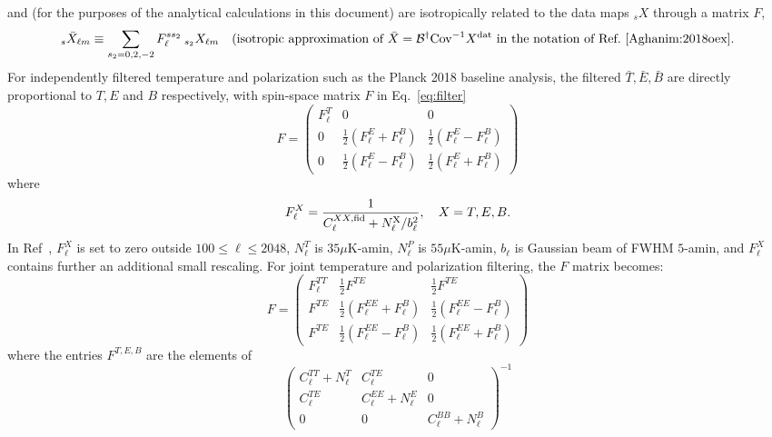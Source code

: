 \documentclass{article}
\newcommand{\Cov}[0]{{\textrm{Cov}}}
\begin{document}
and (for the purposes of the analytical calculations in this document) are isotropically related to the data maps $_sX$ through a matrix $F$,
\begin{equation}\label{eq:filter}
	_{s}\bar X_{\ell m} \equiv \sum_{s_2 = 0,2,-2}F_\ell^{s s_2} \:_{s_2}X_{\ell m} \quad \textrm{(isotropic approximation of } \bar X = \mathcal B^\dagger \Cov^{-1} X ^\textrm{\rm dat}\textrm{ in the notation of Ref.~\cite{Aghanim:2018oex}}.
\end{equation} 
For independently filtered temperature and polarization such as the Planck 2018 baseline analysis, the filtered $\bar T, \bar E, \bar B$ are directly proportional to $T, E$ and $B$ respectively, with spin-space matrix $F$ in Eq.~\eqref{eq:filter}
\begin{equation}
	F = \begin{pmatrix}
		F^T_\ell & 0 & 0 \\ 0 & \frac 12 \left( F^{E}_\ell  + F^{B}_\ell\right) & \frac 12 \left( F^{E}_\ell  - F^{B}_\ell\right) \\ 0& \frac 12 \left( F^{E}_\ell  - F^{B}_\ell\right) & \frac 12 \left( F^{E}_\ell  + F^{B}_\ell\right)
	\end{pmatrix}
\end{equation}
where
\begin{equation}
F_\ell^{X} = \frac{1}{C_\ell^{XX,\rm fid} + N_\ell^{\rm X} /b_\ell^2}, \quad X = T,E,B.
\end{equation}
In Ref~\cite{Aghanim:2018oex}, $F_\ell^{X}$ is set to zero outside $100 \le \ell \le 2048$, $N^T_\ell$ is $35 \mu$K-amin, $N^P_\ell$ is $55 \mu$K-amin, $b_\ell$ is Gaussian beam of FWHM $5$-amin, and $F_\ell^X$ contains further an additional small rescaling. 
For joint temperature and polarization filtering, the $F$ matrix becomes:
\begin{equation}
	F = \begin{pmatrix}
		F^{TT}_\ell &  \frac 12 F^{TE} &   \frac12 F^{TE} \\  F^{TE} & \frac 12 \left( F^{EE}_\ell  + F^{B}_\ell\right) & \frac 12 \left( F^{EE}_\ell  - F^{B}_\ell\right) \\ F^{TE}& \frac 12 \left( F^{EE}_\ell  - F^{B}_\ell\right) & \frac 12 \left( F^{EE}_\ell  + F^{B}_\ell\right)
	\end{pmatrix}
\end{equation}
where the entries $F^{T, E, B}$ are the elements of
\begin{equation}
 \begin{pmatrix}  C_\ell^{TT} + N_\ell^T &C^{TE}_\ell &  0 \\ C^{TE}_\ell & C_\ell^{EE} + N_\ell^E  & 0\\  0 & 0 &  C_\ell^{BB} + N_\ell^B
 	
 \end{pmatrix}^{-1}
\end{equation}
\end{document}
